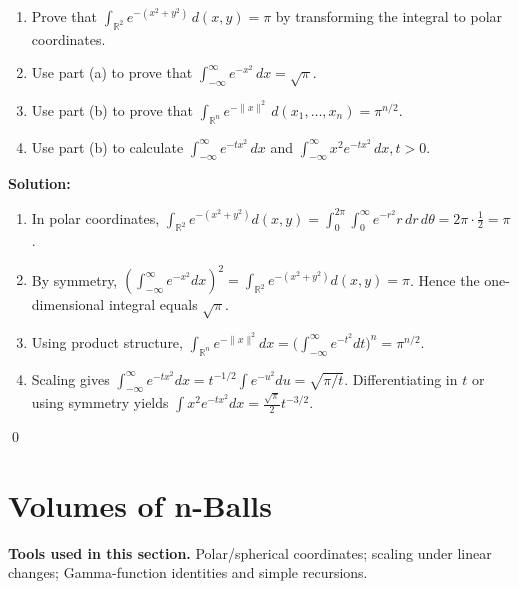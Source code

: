 \begin{problembox}
\begin{enumerate}[label=(\alph*)]
\item Prove that \(\int_{\mathbb{R}^2} e^{-(x^2 + y^2)} \, d(x, y) = \pi\) by transforming the integral to polar coordinates.
\item Use part (a) to prove that \(\int_{-\infty}^{\infty} e^{-x^2} \, dx = \sqrt{\pi}\).
\item Use part (b) to prove that \(\int_{\mathbb{R}^n} e^{-\|x\|^2} \, d(x_1, \ldots, x_n) = \pi^{n/2}\).
\item Use part (b) to calculate \(\int_{-\infty}^{\infty} e^{-tx^2} \, dx\) and \(\int_{-\infty}^{\infty} x^2 e^{-tx^2} \, dx, t > 0\).
\end{enumerate}
\end{problembox}

\noindent\textbf{Solution:}
\begin{enumerate}[label=(\alph*)]
\item In polar coordinates,
\(\int_{\mathbb{R}^2} e^{-(x^2+y^2)} d(x,y)=\int_0^{2\pi}\int_0^{\infty} e^{-r^2} r\,dr\,d\theta=2\pi\cdot\tfrac12=\pi\).
\item By symmetry, \(\left(\int_{-\infty}^{\infty} e^{-x^2}dx\right)^2=\int_{\mathbb{R}^2} e^{-(x^2+y^2)}d(x,y)=\pi\). Hence the one-dimensional integral equals \(\sqrt{\pi}\).
\item Using product structure, \(\int_{\mathbb{R}^n} e^{-\|x\|^2}dx=\big(\int_{-\infty}^{\infty} e^{-t^2}dt\big)^n=\pi^{n/2}\).
\item Scaling gives \(\int_{-\infty}^{\infty} e^{-t x^2} dx = t^{-1/2}\int e^{-u^2}du = \sqrt{\pi/t}\). Differentiating in \(t\) or using symmetry yields \(\int x^2 e^{-t x^2} dx = \tfrac{\sqrt{\pi}}{2} t^{-3/2}\).
\end{enumerate}\qed
\section{Volumes of n-Balls}

\noindent\textbf{Tools used in this section.} Polar/spherical coordinates; scaling under linear changes; Gamma-function identities and simple recursions.



